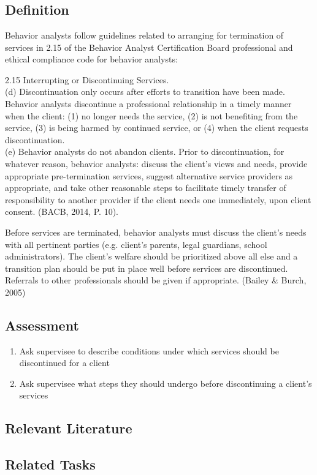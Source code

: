 \clearpage \section[\fourkTen{}]{\fourkTen{}%
              }
\subsection{Definition}
Behavior analysts follow guidelines related to arranging for termination of services in 2.15 of the Behavior Analyst Certification Board professional and ethical compliance code for behavior analysts:

2.15 Interrupting or Discontinuing Services. \\
 (d) Discontinuation only occurs after efforts to transition have been made. Behavior analysts discontinue a professional relationship in a timely manner when the client: (1) no longer needs the service, (2) is not benefiting from the service, (3) is being harmed by continued service, or (4) when the client requests discontinuation. \\
(e) Behavior analysts do not abandon clients. Prior to discontinuation, for whatever reason, behavior analysts: discuss the client's views and needs, provide appropriate pre-termination services, suggest alternative service providers as appropriate, and take other reasonable steps to facilitate timely transfer of responsibility to another provider if the client needs one immediately, upon client consent. (BACB, 2014, P. 10).

Before services are terminated, behavior analysts must discuss the client's needs with all pertinent parties (e.g. client's parents, legal guardians, school administrators). The client's welfare should be prioritized above all else and a transition plan should be put in place well before services are discontinued. Referrals to other professionals should be given if appropriate. (Bailey \& Burch, 2005)
%
\subsection{Assessment}
\begin{enumerate}
\item Ask supervisee to describe conditions under which services should be discontinued for a client
\item Ask supervisee what steps they should undergo before discontinuing a client's services
%
\end{enumerate}
%
\subsection{Relevant Literature}
\begin{refsection}
\nocite{bailey2013ethics,
        bac2014professional}
\printbibliography[heading=none]
\end{refsection}
%
\subsection{Related Tasks}
\fourgSeven{}\\
\fourkNine{}\\
